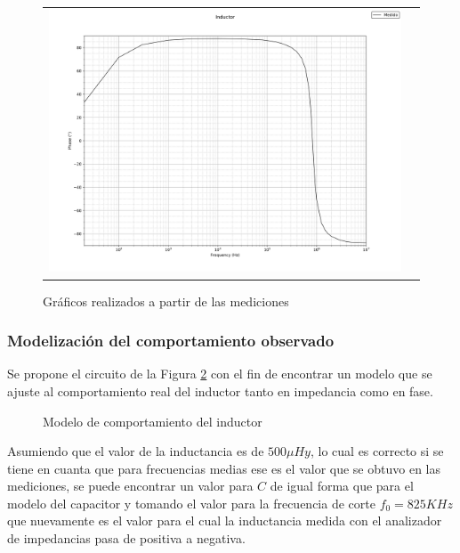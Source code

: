 \begin{figure}[H]
{\begin{tabular}{c c}
            \includegraphics{Recursos/fase_medida_ind.png}

        \end{tabular}
    }
    \caption{Gr\'aficos realizados a partir de las mediciones}
    \label{fig:Med_IND}
        
\end{figure}    

\subsubsection{Modelizaci\'on del comportamiento observado}
Se propone el circuito de la Figura \ref{fig:modelo_IND} con el fin de encontrar un modelo que se ajuste al comportamiento real del inductor tanto en impedancia como en fase.
\begin{figure}[H]
    \centering
    \caption{Modelo de comportamiento del inductor}
    \label{fig:modelo_IND}
\end{figure}
Asumiendo que el valor de la inductancia es de $500\mu Hy$, lo cual es correcto si se tiene en cuanta que para frecuencias medias ese es el valor que se obtuvo en las mediciones, se puede encontrar un valor para $C$ de igual forma que para el modelo del capacitor y tomando el valor para la frecuencia de corte $f_0 = 825KHz$ que nuevamente es el valor para el cual la inductancia medida con el analizador de impedancias pasa de positiva a negativa.

